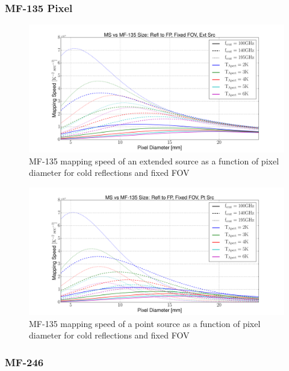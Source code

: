 \documentclass[12pt, titlepage]{article} %
\begin{document}

\subsubsection{MF-135 Pixel}

\begin{figure}[H]
	\centering
	\includegraphics[width=1.1\textwidth, center]{PDF/LFT_MS_MF-135_coldRefl_fixFOV_extSrc.pdf}
	\caption{MF-135 mapping speed of an extended source as a function of pixel diameter for cold reflections and fixed FOV}
\end{figure}

\begin{figure}[H]
	\centering
	\includegraphics[width=1.1\textwidth, center]{PDF/LFT_MS_MF-135_coldRefl_fixFOV_ptSrc.pdf}
	\caption{MF-135 mapping speed of a point source as a function of pixel diameter for cold reflections and fixed FOV}
\end{figure}


\subsubsection{MF-246}
\end{document}
